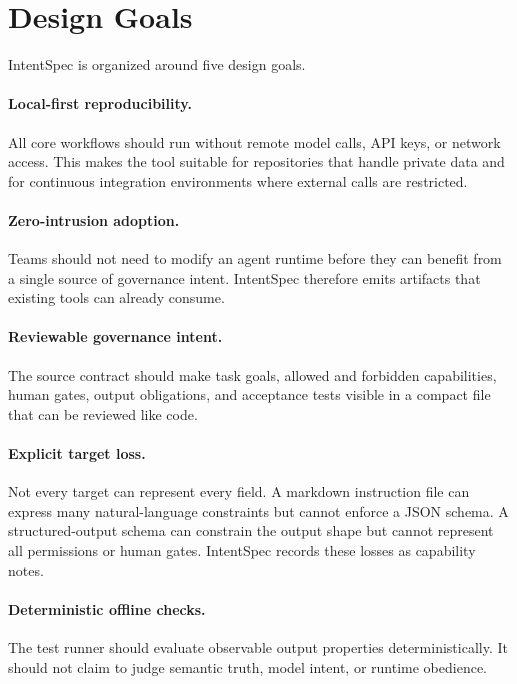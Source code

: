 \documentclass[11pt]{article}
\begin{document}
\section{Design Goals}

IntentSpec is organized around five design goals.

\paragraph{Local-first reproducibility.}
All core workflows should run without remote model calls, API keys, or network
access. This makes the tool suitable for repositories that handle private data and
for continuous integration environments where external calls are restricted.

\paragraph{Zero-intrusion adoption.}
Teams should not need to modify an agent runtime before they can benefit from a
single source of governance intent. IntentSpec therefore emits artifacts that
existing tools can already consume.

\paragraph{Reviewable governance intent.}
The source contract should make task goals, allowed and forbidden capabilities,
human gates, output obligations, and acceptance tests visible in a compact file that
can be reviewed like code.

\paragraph{Explicit target loss.}
Not every target can represent every field. A markdown instruction file can express
many natural-language constraints but cannot enforce a JSON schema. A
structured-output schema can constrain the output shape but cannot represent all
permissions or human gates. IntentSpec records these losses as capability notes.

\paragraph{Deterministic offline checks.}
The test runner should evaluate observable output properties deterministically. It
should not claim to judge semantic truth, model intent, or runtime obedience.
\end{document}
